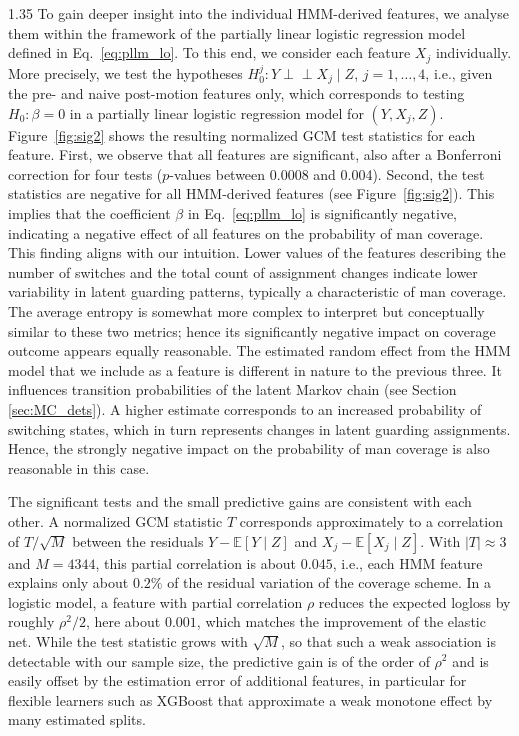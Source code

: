 \documentclass[12pt,a4paper]{article}
\begin{document}
\begin{spacing}{1.35}
To gain deeper insight into the individual HMM-derived features, we analyse them within the framework of the partially linear logistic regression model defined in Eq.~\ref{eq:pllm_lo}. To this end, we consider each feature $X_j$ individually. More precisely, we test the hypotheses $H_0^j: Y \perp\!\!\!\perp X_j \mid Z$, $j = 1,\dots,4$, i.e., given the pre- and naive post-motion features only, which corresponds to testing $H_0: \beta = 0$ in a partially linear logistic regression model for $(Y,X_j,Z)$. Figure~\ref{fig:sig2} shows the resulting normalized GCM test statistics for each feature. First, we observe that all features are significant, also after a Bonferroni correction for four tests ($p$-values between 0.0008 and 0.004). Second, the test statistics are negative for all HMM-derived features (see Figure~\ref{fig:sig2}). This implies that the coefficient $\beta$ in Eq.~\ref{eq:pllm_lo} is significantly negative, indicating a negative effect of all features on the probability of man coverage. This finding aligns with our intuition. Lower values of the features describing the number of switches and the total count of assignment changes indicate lower variability in latent guarding patterns, typically a characteristic of man coverage. The average entropy is somewhat more complex to interpret but conceptually similar to these two metrics; hence its significantly negative impact on coverage outcome appears equally reasonable. The estimated random effect from the HMM model that we include as a feature is different in nature to the previous three. It influences transition probabilities of the latent Markov chain (see Section \ref{sec:MC_dets}). A higher estimate corresponds to an increased probability of switching states, which in turn represents changes in latent guarding assignments. Hence, the strongly negative impact on the probability of man coverage is also reasonable in this case.

The significant tests and the small predictive gains are consistent with each other. A normalized GCM statistic $T$ corresponds approximately to a correlation of $T/\sqrt{M}$ between the residuals $Y - \mathbb{E}[Y \mid Z]$ and $X_j - \mathbb{E}[X_j \mid Z]$. With $|T| \approx 3$ and $M = 4344$, this partial correlation is about $0.045$, i.e., each HMM feature explains only about $0.2\%$ of the residual variation of the coverage scheme. In a logistic model, a feature with partial correlation $\rho$ reduces the expected logloss by roughly $\rho^2/2$, here about $0.001$, which matches the improvement of the elastic net. While the test statistic grows with $\sqrt{M}$, so that such a weak association is detectable with our sample size, the predictive gain is of the order of $\rho^2$ and is easily offset by the estimation error of additional features, in particular for flexible learners such as XGBoost that approximate a weak monotone effect by many estimated splits.



\end{spacing}
\end{document}

